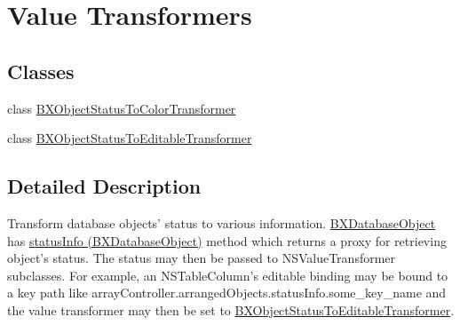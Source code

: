\hypertarget{group__value__transformers}{}\section{Value Transformers}
\label{group__value__transformers}
\subsection*{Classes}
\begin{DoxyCompactItemize}
\item 
class \hyperlink{interface_b_x_object_status_to_color_transformer}{B\+X\+Object\+Status\+To\+Color\+Transformer}
\item 
class \hyperlink{interface_b_x_object_status_to_editable_transformer}{B\+X\+Object\+Status\+To\+Editable\+Transformer}
\end{DoxyCompactItemize}


\subsection{Detailed Description}
Transform database objects' status to various information. \hyperlink{interface_b_x_database_object}{B\+X\+Database\+Object} has \hyperlink{interface_b_x_database_object_a265a128ae31aff014eff278ec66ae1da}{status\+Info (\+B\+X\+Database\+Object)} method which returns a proxy for retrieving object's status. The status may then be passed to N\+S\+Value\+Transformer subclasses. For example, an N\+S\+Table\+Column's editable binding may be bound to a key path like array\+Controller.\+arranged\+Objects.\+status\+Info.\+some\+\_\+key\+\_\+name and the value transformer may then be set to \hyperlink{interface_b_x_object_status_to_editable_transformer}{B\+X\+Object\+Status\+To\+Editable\+Transformer}. 